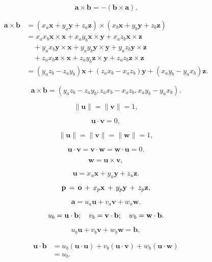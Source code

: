 \documentclass[lang=cn,12pt]{elegantbook}
\begin{document}
$$
  \mathbf{a}\times\mathbf{b}=-(\mathbf{b}\times\mathbf{a}).
$$

\begin{equation}
  \begin{aligned}
    \mathbf{a}\times\mathbf{b}
     & =(x_{a}\mathbf{x}+y_{a}\mathbf{y}+z_{a}\mathbf{z})\times(x_{b}\mathbf{x}+y_{b}\mathbf{y}+z_{b}\mathbf{z})             \\
     & =x_{a}x_{b}\mathbf{x}\times\mathbf{x}+x_{a}y_{b}\mathbf{x}\times\mathbf{y}+x_{a}z_{b}\mathbf{x}\times\mathbf{z}       \\
     & \quad +y_{a}x_{b}\mathbf{y}\times\mathbf{x}+y_{a}y_{b}\mathbf{y}\times\mathbf{y}+y_{a}z_{b}\mathbf{y}\times\mathbf{z} \\
     & \quad +z_{a}x_{b}\mathbf{z}\times\mathbf{x}+z_{a}y_{b}\mathbf{z}\times\mathbf{y}+z_{a}z_{b}\mathbf{z}\times\mathbf{z} \\
     & =(y_{a}z_{b}-z_{a}y_{b})\mathbf{x}+(z_{a}x_{b}-x_{a}z_{b})\mathbf{y}+(x_{a}y_{b}-y_{a}x_{b})\mathbf{z}.
  \end{aligned}
\end{equation}

\begin{equation}
  \mathbf{a}\times\mathbf{b}=(y_{a}z_{b}-z_{a}y_{b},z_{a}x_{b}-x_{a}z_{b},x_{a}y_{b}-y_{a}x_{b}).
\end{equation}

$$
  \|\mathbf{u}\|=\|\mathbf{v}\|=1,
$$

$$
  \mathbf{u}\cdot\mathbf{v}=0,
$$

$$
  \|\mathbf{u}\|=\|\mathbf{v}\|=\|\mathbf{w}\|=1,
$$

$$
  \mathbf{u}\cdot\mathbf{v}=\mathbf{v}\cdot\mathbf{w}=\mathbf{w}\cdot\mathbf{u}=0.
$$

$$
  \mathbf{w}=\mathbf{u}\times\mathbf{v},
$$

$$
  \mathbf{u}=x_{u}\mathbf{x}+y_{u}\mathbf{y}+z_{u}\mathbf{z}.
$$

$$
  {\bf p}\,=\,{\bf o}\,+\,x_{p}{\bf x}\,+\,y_{p}{\bf y}\,+\,z_{p}{\bf z},
$$

$$
  \mathbf{a}=u_{a}\mathbf{u}+v_{a}\mathbf{v}+w_{a}\mathbf{w}.
$$

$$
  u_{b}={\bf u}\cdot{\bf b};\quad v_{b}={\bf v}\cdot{\bf b};\quad w_{b}={\bf w}\cdot{\bf b}.
$$

$$
  u_{b}\mathbf{u}+v_{b}\mathbf{v}+w_{b}\mathbf{w}=\mathbf{b},
$$

$$
  \begin{aligned}
    \mathbf{u \cdot b} & =u_{b}(\mathbf{u \cdot u})+v_{b}(\mathbf{u \cdot v})+w_{b}(\mathbf{u \cdot w}) \\
                       & =u_{b}.
  \end{aligned}
$$
\end{document}
